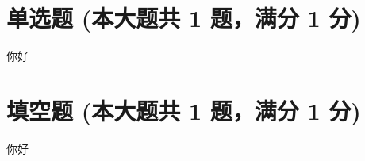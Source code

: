 \documentclass[12pt, a4paper, addpoints]{exam}
\begin{document}
\pagestyle{headandfoot}

\begin{center}
\end{center}
\vspace{5mm}

\normalsize
\vspace{5mm}

\section{\normalsize{单选题 (本大题共 1 题，满分 1 分)}}
\hspace{1.5cm}

\begin{questions}
\question[1] 你好

\begin{oneparchoices}
\end{oneparchoices}

\end{questions}

\hspace{5cm}

\section{\normalsize{填空题 (本大题共 1 题，满分 1 分)}}
\hspace{1.5cm}

\begin{questions}
\question[1] 你好\uline{\qquad\qquad\qquad}~

\end{questions}
\end{document}
